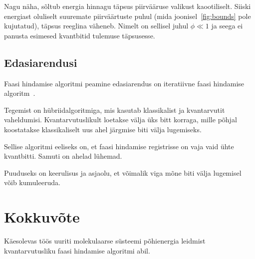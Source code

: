 \documentclass[12pt]{report}
\begin{document}
Nagu näha, sõltub energia hinnagu täpsus piirvääruse valikust kaootiliselt.
Siiski energiast oluliselt suuremate piirväärtuste puhul (mida joonisel~\ref{fig:bounds} pole kujutatud), täpsus reeglina väheneb.
Nimelt on sellisel juhul \(\phi \ll 1\) ja seega ei panusta esimesed kvantbitid tulemuse täpsusesse.


\section{Edasiarendusi}

Faasi hindamise algoritmi peamine edasiarendus on iteratiivne faasi hindamise algoritm~\cite{mcardle+etal, omalley+etal}.

Tegemist on hübriidalgoritmiga, mis kasutab klassikalist ja kvantarvutit vaheldumisi.
Kvantarvutuslikult loetakse välja üks bitt korraga, mille põhjal koostatakse klassikaliselt uus ahel järgmise biti välja lugemiseks.

Sellise algoritmi eeliseks on, et faasi hindamise registrisse on vaja vaid ühte kvantbitti.
Samuti on ahelad lühemad.

Puuduseks on keerulisus ja asjaolu, et võimalik viga mõne biti välja lugemisel võib kumuleeruda.



\chapter{Kokkuvõte}

Käesolevas töös uuriti molekulaarse süsteemi põhienergia leidmist
kvantarvutusliku faasi hindamise algoritmi abil.

\printbibliography[heading=bibintoc, title=Kirjandus]
\end{document}
